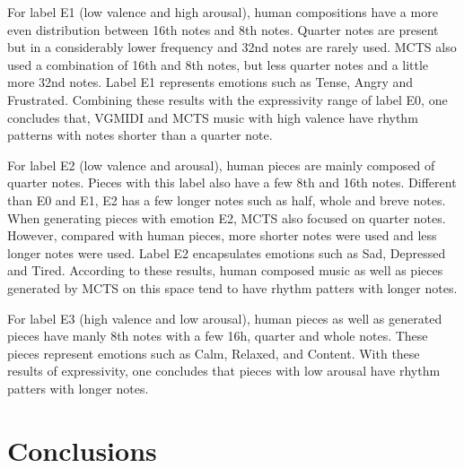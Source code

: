 For label E1 (low valence and high arousal), human compositions have a more even distribution between 16th notes and 8th notes. Quarter notes are present but in a considerably lower frequency and 32nd notes are rarely used. MCTS also used a combination of 16th and 8th notes, but less quarter notes and a little more 32nd notes.
Label E1 represents emotions such as Tense, Angry and Frustrated. Combining these results with the expressivity range of label E0, one concludes that, VGMIDI and MCTS music with high valence have rhythm patterns with notes shorter than a quarter note.

For label E2 (low valence and arousal), human  pieces are mainly composed of quarter notes. Pieces with this label also have a few 8th and 16th notes. Different than E0 and E1, E2 has a few longer notes such as half, whole and breve notes. When generating pieces with emotion E2, MCTS also focused on quarter notes. However, compared with human pieces, more shorter notes were used and less longer notes were used. Label E2 encapsulates emotions such as Sad, Depressed and Tired. According to these results, human composed music as well as pieces generated by MCTS on this space tend to have rhythm patters with longer notes.


For label E3 (high valence and low arousal), human pieces as well as generated pieces have manly 8th notes with a few 16h, quarter and whole notes.  These pieces represent emotions such as Calm, Relaxed, and Content. With these results of expressivity, one concludes that pieces with low arousal have rhythm patters with longer notes.


\section{Conclusions}

